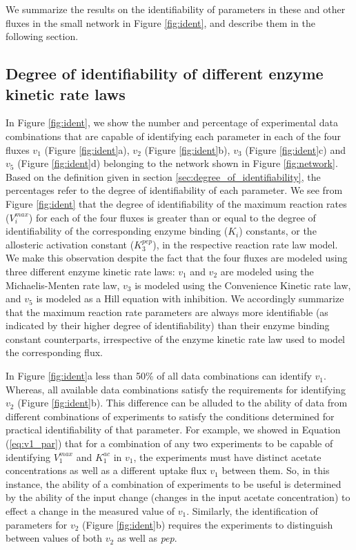 \documentclass[10pt]{article}
\begin{document}
	We summarize the results on the identifiability of parameters in these and other fluxes in the small network in Figure \ref{fig:ident}, and describe them in the following section.
	
	\subsection{Degree of identifiability of different enzyme kinetic rate laws}\label{sec:ident_rate_laws}	
	In Figure \ref{fig:ident}, we show the number and percentage of experimental data combinations that are capable of identifying each parameter in each of the four fluxes $v_1$ (Figure \ref{fig:ident}a), $v_2$ (Figure \ref{fig:ident}b), $v_3$ (Figure \ref{fig:ident}c) and $v_5$ (Figure \ref{fig:ident}d) belonging to the network shown in Figure \ref{fig:network}. Based on the definition given in section \ref{sec:degree_of_identifiability}, the percentages refer to the degree of identifiability of each parameter. We see from Figure \ref{fig:ident} that the degree of identifiability of the maximum reaction rates ($V_i^{max}$) for each of the four fluxes is greater than or equal to the degree of identifiability of the corresponding enzyme binding ($K_i$) constants, or the allosteric activation constant ($K_3^{pep}$), in the respective reaction rate law model. We make this observation despite the fact that the four fluxes are modeled using three different enzyme kinetic rate laws: $v_1$ and $v_2$ are modeled using the Michaelis-Menten rate law, $v_3$ is modeled using the Convenience Kinetic rate law, and $v_5$ is modeled as a Hill equation with inhibition. We accordingly summarize that the maximum reaction rate parameters are always more identifiable (as indicated by their higher degree of identifiability) than their enzyme binding constant counterparts, irrespective of the enzyme kinetic rate law used to model the corresponding flux.
	
	In Figure \ref{fig:ident}a less than 50\% of all data combinations can identify $v_1$. Whereas, all available data combinations satisfy the requirements for identifying $v_2$ (Figure \ref{fig:ident}b). This difference can be alluded to the ability of data from different combinations of experiments to satisfy the conditions determined for practical identifiability of that parameter. For example, we showed in Equation (\ref{eq:v1_par}) that for a combination of any two experiments to be capable of identifying $V_1^{max}$ and $K_1^{ac}$ in $v_1$, the experiments must have distinct acetate concentrations as well as a different uptake flux $v_1$ between them. So, in this instance, the ability of a combination of experiments to be useful is determined by the ability of the input change (changes in the input acetate concentration) to effect a change in the measured value of $v_1$. Similarly, the identification of parameters for $v_2$ (Figure \ref{fig:ident}b) requires the experiments to distinguish between values of both $v_2$ as well as \textit{pep}.
		
\end{document}
